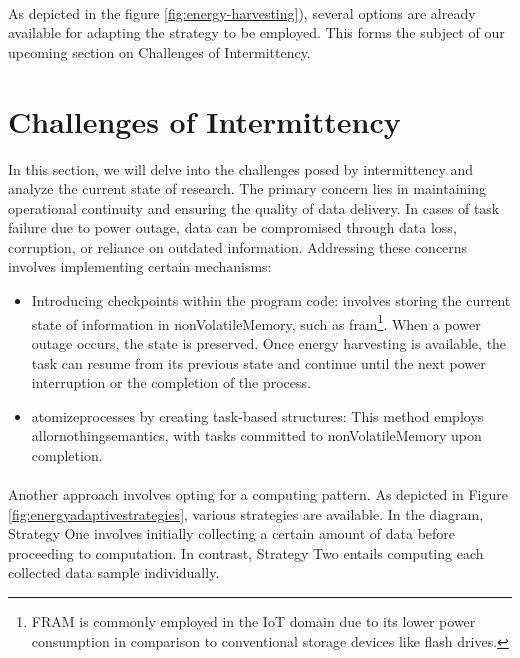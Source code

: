     \paragraph{}
        As depicted in the figure \ref{fig:energy-harvesting}), several options are already available for adapting the strategy to be employed. This forms the subject of our upcoming section on Challenges of Intermittency.
    

\newpage

\section{Challenges of Intermittency}
    In this section, we will delve into the challenges posed by intermittency and analyze the current state of research. The primary concern lies in maintaining operational continuity and ensuring the quality of data delivery. In cases of task failure due to power outage, data can be compromised through data loss, corruption, or reliance on outdated information. Addressing these concerns involves implementing certain mechanisms\cite{basedArticle}\cite{rfidEnergyAwareCheckpointing}:

    \begin{itemize}
        \item Introducing checkpoints within the program code: involves storing the current state of information in \gls{nonVolatileMemory}, such as \gls{fram}\footnote{FRAM is commonly employed in the IoT domain due to its lower power consumption in comparison to conventional storage devices like flash drives\cite{enwiki:1169326001}.}. When a power outage occurs, the state is preserved. Once energy harvesting is available, the task can resume from its previous state and continue until the next power interruption or the completion of the process.
        \item \gls{atomizeprocesses} by creating task-based structures: This method employs \gls{allornothingsemantics}, with tasks committed to \gls{nonVolatileMemory} upon completion.
    \end{itemize}

    \paragraph{}
        Another approach involves opting for a computing pattern. As depicted in Figure \ref{fig:energyadaptivestrategies}, various strategies are available. In the diagram, Strategy One involves initially collecting a certain amount of data before proceeding to computation. In contrast, Strategy Two entails computing each collected data sample individually\cite{10.1145/3478077}.

